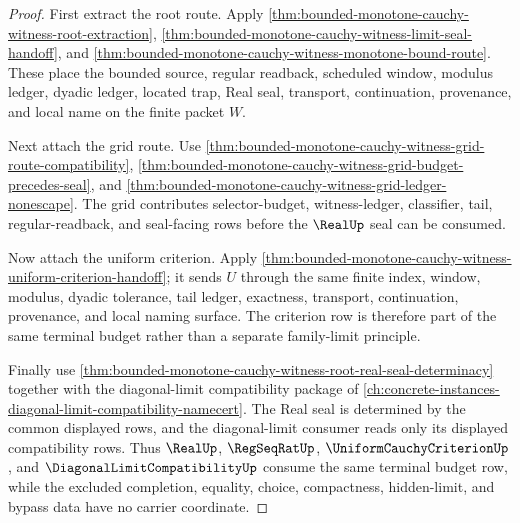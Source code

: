 \begin{proof}
First extract the root route. Apply \autoref{thm:bounded-monotone-cauchy-witness-root-extraction}, \autoref{thm:bounded-monotone-cauchy-witness-limit-seal-handoff}, and \autoref{thm:bounded-monotone-cauchy-witness-monotone-bound-route}. These place the bounded source, regular readback, scheduled window, modulus ledger, dyadic ledger, located trap, Real seal, transport, continuation, provenance, and local name on the finite packet $W$.

Next attach the grid route. Use \autoref{thm:bounded-monotone-cauchy-witness-grid-route-compatibility}, \autoref{thm:bounded-monotone-cauchy-witness-grid-budget-precedes-seal}, and \autoref{thm:bounded-monotone-cauchy-witness-grid-ledger-nonescape}. The grid contributes selector-budget, witness-ledger, classifier, tail, regular-readback, and seal-facing rows before the $\RealUp$ seal can be consumed.

Now attach the uniform criterion. Apply \autoref{thm:bounded-monotone-cauchy-witness-uniform-criterion-handoff}; it sends $U$ through the same finite index, window, modulus, dyadic tolerance, tail ledger, exactness, transport, continuation, provenance, and local naming surface. The criterion row is therefore part of the same terminal budget rather than a separate family-limit principle.

Finally use \autoref{thm:bounded-monotone-cauchy-witness-root-real-seal-determinacy} together with the diagonal-limit compatibility package of \autoref{ch:concrete-instances-diagonal-limit-compatibility-namecert}. The Real seal is determined by the common displayed rows, and the diagonal-limit consumer reads only its displayed compatibility rows. Thus $\RealUp$, $\RegSeqRatUp$, $\UniformCauchyCriterionUp$, and $\DiagonalLimitCompatibilityUp$ consume the same terminal budget row, while the excluded completion, equality, choice, compactness, hidden-limit, and bypass data have no carrier coordinate.
\end{proof}

